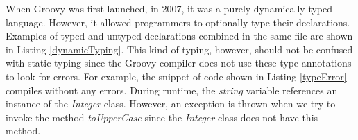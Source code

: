 \documentclass[preprint]{sigplanconf}
\begin{document}
% 
% 
% 
% 

When Groovy was first launched, in 2007, it was a purely dynamically typed language.
However, it allowed programmers to optionally type their declarations.
Examples of typed and untyped declarations combined in the same file are shown in Listing \ref{dynamicTyping}.
This kind of typing, however, should not be confused with static typing since the Groovy compiler does not use these type annotations to look for errors.
For example, the snippet of code shown in Listing \ref{typeError} compiles without any errors.
During runtime, the \emph{string} variable references an instance of the \emph{Integer} class.
However, an exception is thrown when we try to invoke the method \emph{toUpperCase} since the \emph{Integer} class does not have this method.
\end{document}
